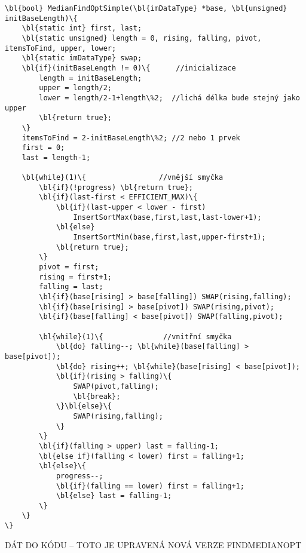         \begin{Verbatim}[commandchars = \\\{\}]
\bl{bool} MedianFindOptSimple(\bl{imDataType} *base, \bl{unsigned} initBaseLength)\{
    \bl{static int} first, last;
    \bl{static unsigned} length = 0, rising, falling, pivot, itemsToFind, upper, lower;
    \bl{static imDataType} swap;
    \bl{if}(initBaseLength != 0)\{      //inicializace
        length = initBaseLength;
        upper = length/2;
        lower = length/2-1+length\%2;  //lichá délka bude stejný jako upper
        \bl{return true};
    \}
    itemsToFind = 2-initBaseLength\%2; //2 nebo 1 prvek
    first = 0;	
    last = length-1;

    \bl{while}(1)\{                 //vnější smyčka
        \bl{if}(!progress) \bl{return true};
        \bl{if}(last-first < EFFICIENT_MAX)\{
            \bl{if}(last-upper < lower - first)
                InsertSortMax(base,first,last,last-lower+1);	
            \bl{else}
                InsertSortMin(base,first,last,upper-first+1);	
            \bl{return true};
        \}
        pivot = first;
        rising = first+1;
        falling = last;
        \bl{if}(base[rising] > base[falling]) SWAP(rising,falling);
        \bl{if}(base[rising] > base[pivot]) SWAP(rising,pivot);
        \bl{if}(base[falling] < base[pivot]) SWAP(falling,pivot);

        \bl{while}(1)\{			     //vnitřní smyčka				
            \bl{do} falling--; \bl{while}(base[falling] > base[pivot]);
            \bl{do} rising++; \bl{while}(base[rising] < base[pivot]);
            \bl{if}(rising > falling)\{	
                SWAP(pivot,falling);
                \bl{break};
            \}\bl{else}\{					
                SWAP(rising,falling);
            \}
        \}
        \bl{if}(falling > upper) last = falling-1;	
        \bl{else if}(falling < lower) first = falling+1;
        \bl{else}\{
            progress--;
            \bl{if}(falling == lower) first = falling+1;
            \bl{else} last = falling-1;
        \}
    \}
\}
        \end{Verbatim}
        
        DÁT DO KÓDU -- TOTO JE UPRAVENÁ NOVÁ VERZE FINDMEDIANOPT
        
